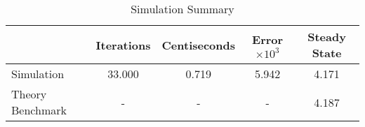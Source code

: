\begin{table}[htb]
\centering
\caption{Simulation Summary}
\label{table:psCp2:tab:sim2c}
\begin{tabular}{lcccc}
\hline
 & Iterations & Centiseconds & Error$\times 10^3$ & Steady State \\
\hline\hline
Simulation & 33.000 & 0.719 & 5.942 & 4.171 \\
Theory Benchmark & - & - & - & 4.187 \\
\hline
\end{tabular}
\end{table}
